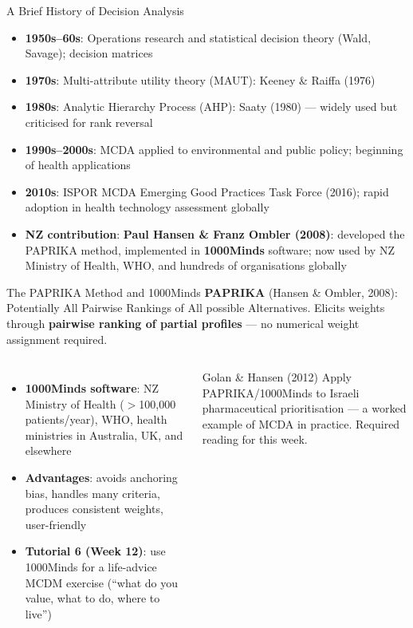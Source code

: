 \documentclass[aspectratio=169, 12pt]{beamer}
\begin{document}
\begin{frame}{A Brief History of Decision Analysis}
  \begin{itemize}
    \item \textbf{1950s--60s}: Operations research and statistical decision theory
          (Wald, Savage); decision matrices
    \item \textbf{1970s}: Multi-attribute utility theory (MAUT): Keeney \& Raiffa (1976)
    \item \textbf{1980s}: Analytic Hierarchy Process (AHP): Saaty (1980) --- widely used
          but criticised for rank reversal
    \item \textbf{1990s--2000s}: MCDA applied to environmental and public policy;
          beginning of health applications
    \item \textbf{2010s}: ISPOR MCDA Emerging Good Practices Task Force (2016);
          rapid adoption in health technology assessment globally
    \item \textbf{NZ contribution}: \textbf{Paul Hansen \& Franz Ombler (2008)}: developed
          the PAPRIKA method, implemented in \textbf{1000Minds} software; now used by
          NZ Ministry of Health, WHO, and hundreds of organisations globally
  \end{itemize}
\end{frame}

\begin{frame}{The PAPRIKA Method and 1000Minds}
  \small
  \textbf{PAPRIKA} (Hansen \& Ombler, 2008): Potentially All Pairwise Rankings of All possible
  Alternatives. Elicits weights through \textbf{pairwise ranking of partial profiles} --- no
  numerical weight assignment required.
  \vspace{0.2em}
  \begin{columns}
      \footnotesize
      \begin{itemize}
        \item \textbf{1000Minds software}: NZ Ministry of Health ($>$100,000 patients/year),
              WHO, health ministries in Australia, UK, and elsewhere
        \item \textbf{Advantages}: avoids anchoring bias, handles many criteria, produces
              consistent weights, user-friendly
        \item \textbf{Tutorial 6 (Week 12)}: use 1000Minds for a life-advice MCDM exercise
              (``what do you value, what to do, where to live'')
      \end{itemize}
      \begin{exampleblock}{Golan \& Hansen (2012)}
        \footnotesize Apply PAPRIKA/1000Minds to Israeli pharmaceutical prioritisation --- a worked
        example of MCDA in practice. Required reading for this week.
      \end{exampleblock}
  \end{columns}
\end{frame}
\end{document}
